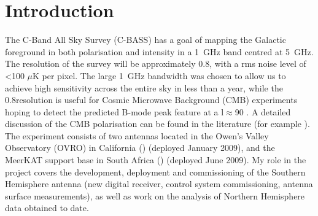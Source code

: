 % 

\section{Introduction}



The C-Band All Sky Survey (C-BASS) has a goal of mapping the Galactic foreground in both polarisation and intensity in a 1~GHz band centred at 5~GHz.  The resolution of the survey will be approximately 0.8\degt, with a  rms noise level of \textless 100 $\mu$K per pixel. The large 1~GHz bandwidth was chosen to allow us to achieve high sensitivity across the entire sky in less than a year, while the 0.8\degt resolution is useful for Cosmic Microwave Background (CMB) experiments hoping to detect the predicted B-mode peak feature at a l$\approx$90 \cite{mortonson_2007}.  A detailed discussion of the CMB polarisation can be found in the literature (for example \cite{2002ApJ...578...12C}).  The experiment consists of two antennas located in the Owen's Valley Observatory (OVRO) in California () (deployed January 2009), and the MeerKAT support base in South Africa ()  (deployed June 2009). My role in the project covers the development, deployment and commissioning of the Southern Hemisphere antenna (new digital receiver, control system commissioning, antenna surface measurements), as well as work on the analysis of Northern Hemisphere data obtained to date.


